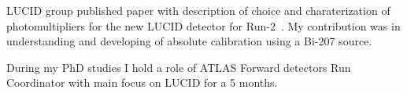 LUCID group published paper with description of choice and charaterization of photomultipliers for the new LUCID detector for Run-2~\cite{Alberghi:2016tad}.
My contribution was in understanding and developing of absolute calibration using a Bi-207 source.

During my PhD studies I hold a role of ATLAS Forward detectors Run Coordinator with main focus on LUCID for a 5 months.

% 
%  
% 
%  
%  
